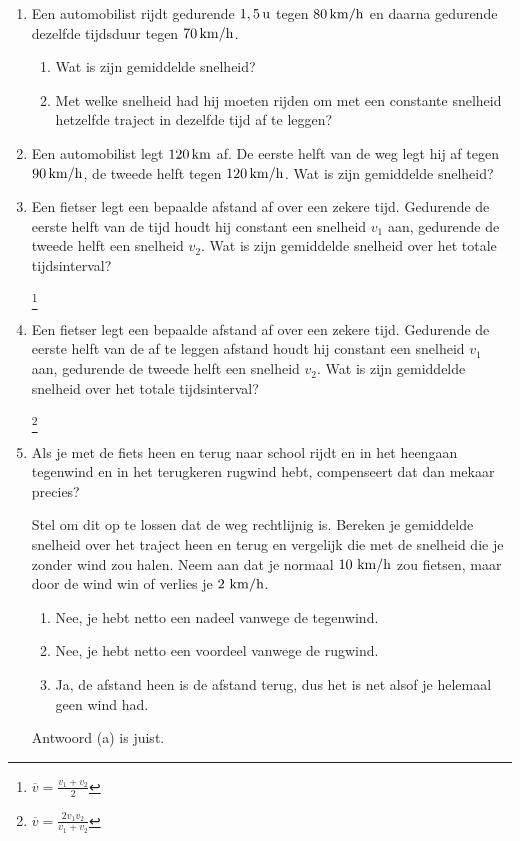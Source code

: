 \begin{enumerate}




\item Een automobilist rijdt gedurende $1,5\rm\,u$ tegen $80\rm\,km/h$ en daarna gedurende dezelfde tijdsduur tegen
$70\rm\,km/h$.
\begin{enumerate}
\item Wat is zijn gemiddelde snelheid?
\item Met welke snelheid had hij moeten rijden om met een constante snelheid hetzelfde traject in dezelfde tijd af te leggen?
\end{enumerate}

\item Een automobilist legt $120\rm\,km$ af. De eerste helft van de weg legt hij af tegen $90\rm\,km/h$, de tweede helft tegen $120\rm\,km/h$. Wat is zijn gemiddelde snelheid?

\item Een fietser legt een bepaalde afstand af over een zekere tijd. Gedurende de eerste helft van de tijd houdt hij constant een snelheid $v_1$ aan, gedurende de tweede helft een snelheid $v_2$. Wat is zijn gemiddelde snelheid over het totale tijdsinterval?
\begin{oplossing}
\footnote{$\overline{v}=\frac{v_1+v_2}{2}$}
\end{oplossing}

\item Een fietser legt een bepaalde afstand af over een zekere tijd. Gedurende de eerste helft van de af te leggen afstand houdt hij constant een snelheid $v_1$ aan, gedurende de tweede helft een snelheid $v_2$. Wat is zijn gemiddelde snelheid over het totale tijdsinterval? 
\begin{oplossing}
\footnote{$\overline{v}=\frac{2v_1v_2}{v_1+v_2}$}
\end{oplossing}


\item Als je met de fiets heen en terug naar school rijdt en in het heengaan tegenwind en in het terugkeren rugwind hebt, compenseert dat dan mekaar precies?

Stel om dit op te lossen dat de weg rechtlijnig is. Bereken je gemiddelde snelheid over het traject heen en terug en vergelijk die met de snelheid die je zonder wind zou halen. Neem aan dat je normaal $10~\rm km/h$ zou fietsen, maar door de wind win of verlies je $2~\rm km/h$.
\begin{enumerate}
\item Nee, je hebt netto een nadeel vanwege de tegenwind.
\item Nee, je hebt netto een voordeel vanwege de rugwind.
\item Ja, de afstand heen is de afstand terug, dus het is net alsof je helemaal geen wind had.
\end{enumerate}
\begin{oplossing}
Antwoord (a) is juist.
\end{oplossing}


\end{enumerate}
